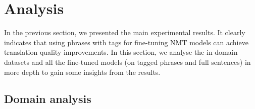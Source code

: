 \section{Analysis}\label{section:anlaysis} %
In the previous section, we presented the main experimental results. It clearly indicates that using phrases with tags for fine-tuning NMT models can achieve translation quality improvements. In this section, we analyse the in-domain datasets and all the fine-tuned models (on tagged phrases and full sentences) in more depth to gain some insights from the results.

\subsection{Domain analysis}%

